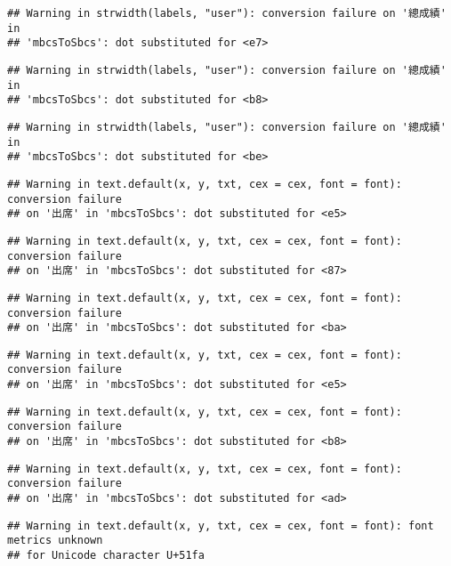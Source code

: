 \documentclass[
]{book}
\begin{document}
\begin{verbatim}
## Warning in strwidth(labels, "user"): conversion failure on '總成績' in
## 'mbcsToSbcs': dot substituted for <e7>
\end{verbatim}

\begin{verbatim}
## Warning in strwidth(labels, "user"): conversion failure on '總成績' in
## 'mbcsToSbcs': dot substituted for <b8>
\end{verbatim}

\begin{verbatim}
## Warning in strwidth(labels, "user"): conversion failure on '總成績' in
## 'mbcsToSbcs': dot substituted for <be>
\end{verbatim}

\begin{verbatim}
## Warning in text.default(x, y, txt, cex = cex, font = font): conversion failure
## on '出席' in 'mbcsToSbcs': dot substituted for <e5>
\end{verbatim}

\begin{verbatim}
## Warning in text.default(x, y, txt, cex = cex, font = font): conversion failure
## on '出席' in 'mbcsToSbcs': dot substituted for <87>
\end{verbatim}

\begin{verbatim}
## Warning in text.default(x, y, txt, cex = cex, font = font): conversion failure
## on '出席' in 'mbcsToSbcs': dot substituted for <ba>
\end{verbatim}

\begin{verbatim}
## Warning in text.default(x, y, txt, cex = cex, font = font): conversion failure
## on '出席' in 'mbcsToSbcs': dot substituted for <e5>
\end{verbatim}

\begin{verbatim}
## Warning in text.default(x, y, txt, cex = cex, font = font): conversion failure
## on '出席' in 'mbcsToSbcs': dot substituted for <b8>
\end{verbatim}

\begin{verbatim}
## Warning in text.default(x, y, txt, cex = cex, font = font): conversion failure
## on '出席' in 'mbcsToSbcs': dot substituted for <ad>
\end{verbatim}

\begin{verbatim}
## Warning in text.default(x, y, txt, cex = cex, font = font): font metrics unknown
## for Unicode character U+51fa
\end{verbatim}
\end{document}

